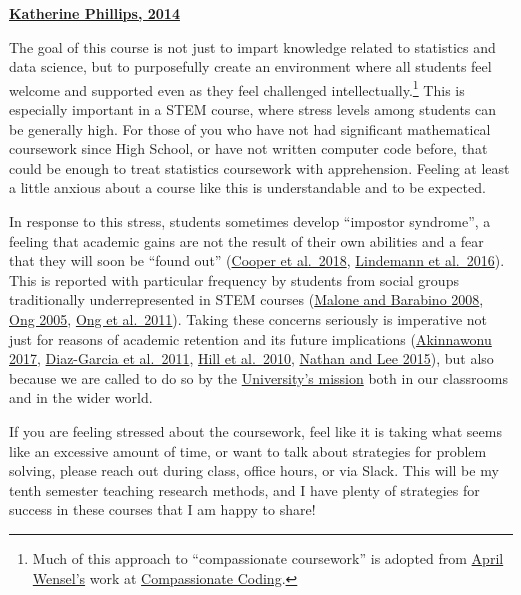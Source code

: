 \documentclass[]{book}
\let\rmarkdownfootnote\footnote%
\def\footnote{\protect\rmarkdownfootnote}
\theoremstyle{definition}
\theoremstyle{definition}
\theoremstyle{definition}
\theoremstyle{remark}
\begin{document}
\textbf{\href{https://www.scientificamerican.com/article/how-diversity-makes-us-smarter/}{Katherine
Phillips, 2014}}

 The goal of this course is not just to impart knowledge related to
statistics and data science, but to purposefully create an environment
where all students feel welcome and supported even as they feel
challenged intellectually.\footnote{Much of this approach to
  ``compassionate coursework'' is adopted from
  \href{https://twitter.com/aprilwensel}{April Wensel's} work at
  \href{https://compassionatecoding.com}{Compassionate Coding}.} This is
especially important in a STEM course, where stress levels among
students can be generally high. For those of you who have not had
significant mathematical coursework since High School, or have not
written computer code before, that could be enough to treat statistics
coursework with apprehension. Feeling at least a little anxious about a
course like this is understandable and to be expected.

In response to this stress, students sometimes develop ``impostor
syndrome'', a feeling that academic gains are not the result of their
own abilities and a fear that they will soon be ``found out''
(\href{https://www.physiology.org/doi/10.1152/advan.00085.2017}{Cooper
et al.~2018},
\href{http://genderandset.open.ac.uk/index.php/genderandset/article/view/435}{Lindemann
et al.~2016}). This is reported with particular frequency by students
from social groups traditionally underrepresented in STEM courses
(\href{https://onlinelibrary.wiley.com/doi/pdf/10.1002/sce.20307}{Malone
and Barabino 2008}, \href{https://doi.org/10.1525/sp.2005.52.4.593}{Ong
2005}, \href{https://doi.org/10.17763/haer.81.2.t022245n7x4752v2}{Ong et
al.~2011}). Taking these concerns seriously is imperative not just for
reasons of academic retention and its future implications
(\href{https://open.nytimes.com/why-having-a-diverse-team-will-make-your-products-better-c73e7518f677}{Akinnawonu
2017},
\href{https://www.tandfonline.com/doi/abs/10.5172/impp.2013.15.2.149}{Diaz-Garcia
et al.~2011},
\href{https://www.aauw.org/aauw_check/pdf_download/show_pdf.php?file=why-so-few-research}{Hill
et al.~2010},
\href{https://www.tandfonline.com/doi/abs/10.1111/ecge.12016}{Nathan and
Lee 2015}), but also because we are called to do so by the
\href{https://www.slu.edu/about/catholic-jesuit-identity/mission.php}{University's
mission} both in our classrooms and in the wider world.

If you are feeling stressed about the coursework, feel like it is taking
what seems like an excessive amount of time, or want to talk about
strategies for problem solving, please reach out during class, office
hours, or via Slack. This will be my tenth semester teaching research
methods, and I have plenty of strategies for success in these courses
that I am happy to share!
\end{document}

